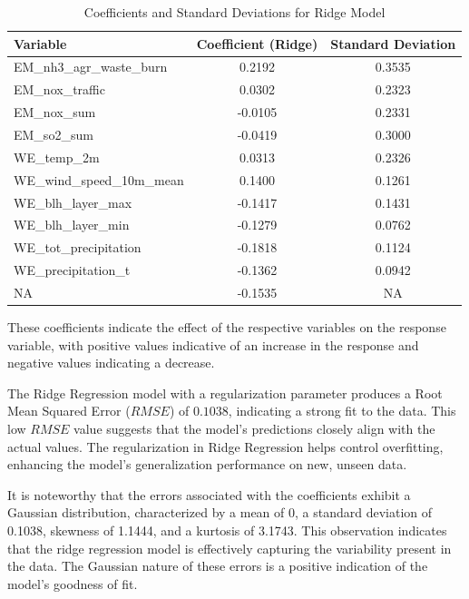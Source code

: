 \documentclass[10pt]{article} %
\begin{document}
    \begin{table}[htbp]
    \centering
    \begin{tabular}{lcc}
    \toprule
    Variable & Coefficient (Ridge) & Standard Deviation \\
    \midrule
    EM\_nh3\_agr\_waste\_burn & 0.2192 & 0.3535 \\
    EM\_nox\_traffic & 0.0302 & 0.2323 \\
    EM\_nox\_sum & -0.0105 & 0.2331 \\
    EM\_so2\_sum & -0.0419 & 0.3000 \\
    WE\_temp\_2m & 0.0313 & 0.2326 \\
    WE\_wind\_speed\_10m\_mean & 0.1400 & 0.1261 \\
    WE\_blh\_layer\_max & -0.1417 & 0.1431 \\
    WE\_blh\_layer\_min & -0.1279 & 0.0762 \\
    WE\_tot\_precipitation & -0.1818 & 0.1124 \\
    WE\_precipitation\_t & -0.1362 & 0.0942 \\
    NA & -0.1535 & NA \\
    \bottomrule
    \end{tabular}
    \caption{Coefficients and Standard Deviations for Ridge Model}
    \label{tab:ridge_coefficients}
    \end{table}
    
    These coefficients indicate the effect of the respective variables on the response variable, with positive values indicative of an increase in the response and negative values indicating a decrease.

    The Ridge Regression model with a regularization parameter produces a Root Mean Squared Error ($RMSE$) of $0.1038$, indicating a strong fit to the data. This low $RMSE$ value suggests that the model's predictions closely align with the actual values. The regularization in Ridge Regression helps control overfitting, enhancing the model's generalization performance on new, unseen data.
    
    It is noteworthy that the errors associated with the coefficients exhibit a Gaussian distribution, characterized by a mean of 0, a standard deviation of 0.1038, skewness of 1.1444, and a kurtosis of 3.1743. This observation indicates that the ridge regression model is effectively capturing the variability present in the data. The Gaussian nature of these errors is a positive indication of the model's goodness of fit.
\end{document}
